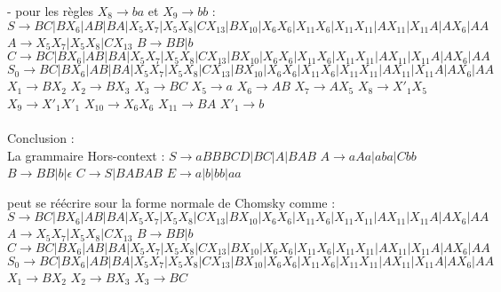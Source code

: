 \documentclass{article}
\begin{document}
- pour les règles $X_8 \rightarrow ba$ et $X_9 \rightarrow bb$  :
\newline $S \rightarrow BC|BX_6|AB|BA|X_5X_7|X_5X_8|CX_{13}|BX_{10}|X_6X_6|X_{11}X_6|X_{11}X_{11}|AX_{11}|X_{11}A|AX_6|AA$
\newline $A \rightarrow X_5X_7|X_5X_8|CX_{13}$
\newline $B \rightarrow BB|b$
\newline $C \rightarrow BC|BX_6|AB|BA|X_5X_7|X_5X_8|CX_{13}|BX_{10}|X_6X_6|X_{11}X_6|X_{11}X_{11}|AX_{11}|X_{11}A|AX_6|AA$
\newline $S_0 \rightarrow BC|BX_6|AB|BA|X_5X_7|X_5X_8|CX_{13}|BX_{10}|X_6X_6|X_{11}X_6|X_{11}X_{11}|AX_{11}|X_{11}A|AX_6|AA$
\newline $X_1 \rightarrow BX_2$
\newline $X_2 \rightarrow BX_3$
\newline $X_3 \rightarrow BC$
\newline $X_5 \rightarrow a$
\newline $X_6 \rightarrow AB$
\newline $X_7 \rightarrow AX_5$
\newline $X_8 \rightarrow X'_1X_5$
\newline $X_9 \rightarrow X'_1X'_1$
\newline $X_{10} \rightarrow X_6X_6$
\newline $X_{11} \rightarrow BA$
\newline $X'_1 \rightarrow b$
\\
\\
Conclusion :\\
La grammaire Hors-context :
\newline $S \rightarrow aBBBCD|BC|A|BAB$
\newline $A \rightarrow aAa|aba|Cbb$
\newline $B \rightarrow BB|b|\epsilon$
\newline $C \rightarrow S|BABAB$
\newline $E \rightarrow a|b|bb|aa$

peut se réécrire sour la forme normale de Chomsky comme :\\
\newline $S \rightarrow BC|BX_6|AB|BA|X_5X_7|X_5X_8|CX_{13}|BX_{10}|X_6X_6|X_{11}X_6|X_{11}X_{11}|AX_{11}|X_{11}A|AX_6|AA$
\newline $A \rightarrow X_5X_7|X_5X_8|CX_{13}$
\newline $B \rightarrow BB|b$
\newline $C \rightarrow BC|BX_6|AB|BA|X_5X_7|X_5X_8|CX_{13}|BX_{10}|X_6X_6|X_{11}X_6|X_{11}X_{11}|AX_{11}|X_{11}A|AX_6|AA$
\newline $S_0 \rightarrow BC|BX_6|AB|BA|X_5X_7|X_5X_8|CX_{13}|BX_{10}|X_6X_6|X_{11}X_6|X_{11}X_{11}|AX_{11}|X_{11}A|AX_6|AA$
\newline $X_1 \rightarrow BX_2$
\newline $X_2 \rightarrow BX_3$
\newline $X_3 \rightarrow BC$
\end{document}
